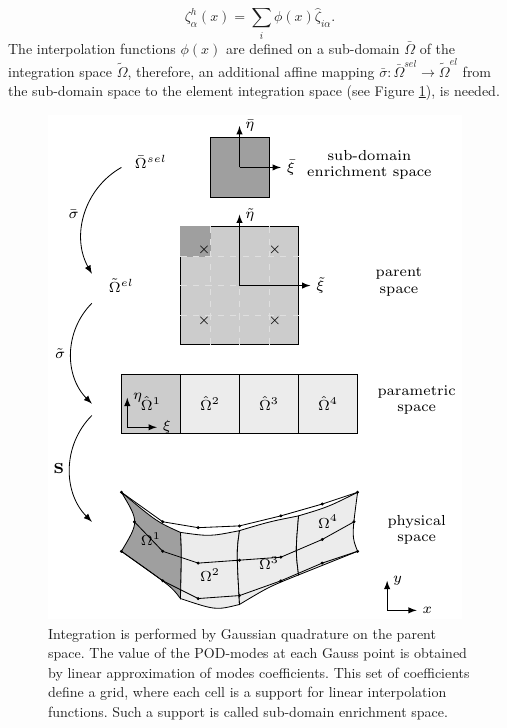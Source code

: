 \documentclass[3p]{article}
\begin{document}
\begin{equation}
\zeta_{\alpha}^{h}(x) = \sum_{i}\phi(x)\hat{\zeta}_{i\alpha}.
\end{equation} 
The interpolation functions $\phi(x)$ are defined on a sub-domain $\bar{\Omega}$ of the integration space $\tilde{\Omega}$, therefore, an additional affine mapping $\bar{\sigma}:\bar{\Omega}^{sel}\rightarrow\tilde{\Omega}^{el}$ from the sub-domain space to the element integration space (see Figure \ref{fig:IntegrationMappingPODXIgA}), is needed.
\begin{figure}
\includegraphics[width=1\linewidth]{externals/Pictures/IntegrationXPOD.pdf}
\caption{Integration is performed by Gaussian quadrature on the parent space. The value of the POD-modes at each Gauss point is obtained by linear approximation of modes coefficients. This set of coefficients define a grid, where each cell is a support for linear interpolation functions. Such a support is called sub-domain enrichment space.}
\label{fig:IntegrationMappingPODXIgA}
\end{figure}
 \\
 \indent
\end{document}
